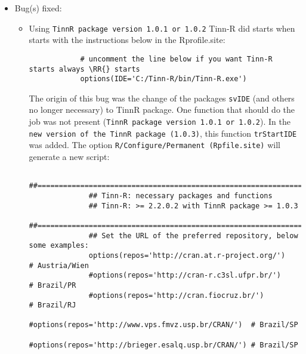\begin{itemize}
  \item Bug(s) fixed:
    \begin{itemize}
      \item Using \texttt{TinnR package version 1.0.1 or 1.0.2} Tinn-R did starts
        when \RR{} starts with the instructions below in the Rprofile.site:

        \begin{Scode}
          \begin{verbatim}
            # uncomment the line below if you want Tinn-R starts always \RR{} starts
            options(IDE='C:/Tinn-R/bin/Tinn-R.exe')
          \end{verbatim}
        \end{Scode}

        The origin of this bug was the change of the packages \texttt{svIDE}
        (and others no longer necessary) to TinnR package. One function that
        should do the job was not present (\texttt{TinnR package version 1.0.1
          or 1.0.2}). In the \texttt{new version of the TinnR package (1.0.3)},
        this function \texttt{trStartIDE} was added. The option
        \texttt{R/Configure/Permanent (Rpfile.site)} will generate a new
        script:

        {\footnotesize                                                                         
          {\color {darkred}                                                                    
            \begin{verbatim}                                                                   
              ##===============================================================                
              ## Tinn-R: necessary packages and functions                                      
              ## Tinn-R: >= 2.2.0.2 with TinnR package >= 1.0.3                                
              ##===============================================================                
              ## Set the URL of the preferred repository, below some examples:                 
              options(repos='http://cran.at.r-project.org/')      # Austria/Wien               
              #options(repos='http://cran-r.c3sl.ufpr.br/')       # Brazil/PR                  
              #options(repos='http://cran.fiocruz.br/')           # Brazil/RJ                  
              #options(repos='http://www.vps.fmvz.usp.br/CRAN/')  # Brazil/SP                  
              #options(repos='http://brieger.esalq.usp.br/CRAN/') # Brazil/SP                  
                                                                                               

\end{verbatim}}}
\end{itemize}
\end{itemize}
